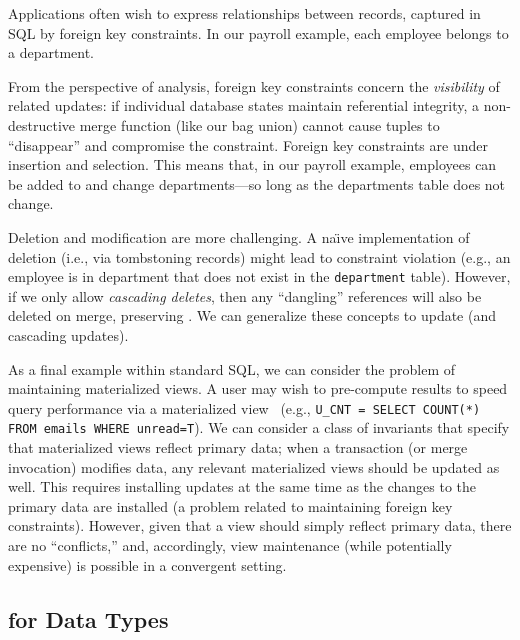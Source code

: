  Applications often wish to express
relationships between records, captured in SQL by foreign key
constraints. In our payroll example, each employee belongs to a
department.

From the perspective of \iconfluence analysis, foreign key constraints
concern the \textit{visibility} of related updates: if individual
database states maintain referential integrity, a non-destructive
merge function (like our bag union) cannot cause tuples to
``disappear'' and compromise the constraint. Foreign key constraints
are \iconfluent under insertion and selection. This means that, in our
payroll example, employees can be added to and change departments---so
long as the departments table does not change.

Deletion and modification are more challenging. A na\"{\i}ve
implementation of deletion (i.e., via tombstoning records) might lead
to constraint violation (e.g., an employee is in department that does
not exist in the \texttt{department} table). However, if we only allow
\textit{cascading deletes}, then any ``dangling'' references will also
be deleted on merge, preserving \iconfluence. We can generalize these
concepts to update (and cascading updates).

 As a final example within standard SQL,
we can consider the problem of maintaining materialized views. A user
may wish to pre-compute results to speed query performance via a
materialized view~\cite{tamer-book} (e.g., \texttt{U\_CNT = SELECT
  COUNT(*) FROM emails WHERE unread=T}). We can consider a class of
invariants that specify that materialized views reflect primary data;
when a transaction (or merge invocation) modifies data, any relevant
materialized views should be updated as well. This requires installing
updates at the same time as the changes to the primary data are
installed (a problem related to maintaining foreign key
constraints). However, given that a view should simply reflect primary
data, there are no ``conflicts,'' and, accordingly, view maintenance
(while potentially expensive) is possible in a convergent setting.

\subsection{\iconfluence for Data Types}

